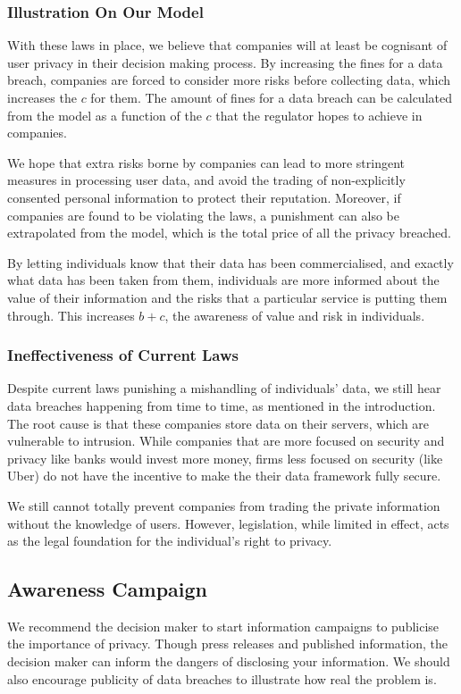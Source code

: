 \documentclass{icmmcm}
\begin{document}
\subsubsection{Illustration On Our Model}
With these laws in place, we believe that companies will at least be cognisant of user privacy in their decision making process. By increasing the fines for a data breach, companies are forced to consider more risks before collecting data, which increases the $c$ for them. The amount of fines for a data breach can be calculated from the model as a function of the $c$ that the regulator hopes to achieve in companies.

We hope that extra risks borne by companies can lead to more stringent measures in processing user data, and avoid the trading of non-explicitly consented personal information to protect their reputation. Moreover, if companies are found to be violating the laws, a punishment can also be extrapolated from the model, which is the total price of all the privacy breached. 

By letting individuals know that their data has been commercialised, and exactly what data has been taken from them, individuals are more informed about the value of their information and the risks that a particular service is putting them through. This increases $b+c$, the awareness of value and risk in individuals. 

\subsubsection{Ineffectiveness of Current Laws}
Despite current laws punishing a mishandling of individuals' data, we still hear data breaches happening from time to time, as mentioned in the introduction.
The root cause is that these companies store data on their servers, which are vulnerable to intrusion. While companies that are more focused on security and privacy like banks would invest more money, firms less focused on security (like Uber) do not have the incentive to make the their data framework fully secure.

We still cannot totally prevent companies from trading the private information without the knowledge of users. However, legislation, while limited in effect, acts as the legal foundation for the individual's right to privacy.

\subsection{Awareness Campaign}
We recommend the decision maker to start information campaigns to publicise the importance of privacy. Though press releases and published information, the decision maker can inform the dangers of disclosing your information. We should also encourage publicity of data breaches to illustrate how real the problem is.
\end{document}
